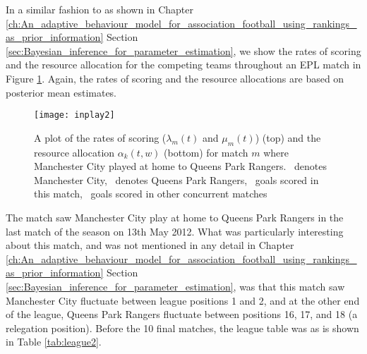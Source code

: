 In a similar fashion to as shown in Chapter
\ref{ch:An_adaptive_behaviour_model_for_association_football_using_rankings_as_prior_information} Section
\ref{sec:Bayesian_inference_for_parameter_estimation}, we show the rates of scoring and the resource allocation for the
competing teams throughout an \gls{EPL} match in Figure \ref{fig:inplay2}. Again, the rates of scoring and the resource
allocations are based on posterior mean estimates.
\begin{figure}[htp]
\begin{center}
\texttt{[image: inplay2]}
\caption{A plot of the rates of scoring (\(\lambda_m(t)\) and \(\mu_m(t)\)) (top) and the resource allocation
\(\alpha_k(t, w)\) (bottom) for match \(m\) where Manchester City played at home to Queens Park Rangers.
\protect\redSolidLine\ denotes Manchester City, \protect\blueDashedLine\ denotes Queens Park Rangers,
\protect\graySolidLine\ goals scored in this match, \protect\grayDashedLine\ goals scored in other concurrent matches}
\label{fig:inplay2}
\end{center} 
\end{figure} 
The match saw Manchester City play at home to Queens Park Rangers in the last match of the season on 13th May 2012. What
was particularly interesting about this match, and was not mentioned in any detail in Chapter
\ref{ch:An_adaptive_behaviour_model_for_association_football_using_rankings_as_prior_information} Section
\ref{sec:Bayesian_inference_for_parameter_estimation}, was that this match saw Manchester City fluctuate between league
positions 1 and 2, and at the other end of the league, Queens Park Rangers fluctuate between positions 16, 17, and 18 (a
relegation position). Before the 10 final matches, the league table was as is shown in Table \ref{tab:league2}.
